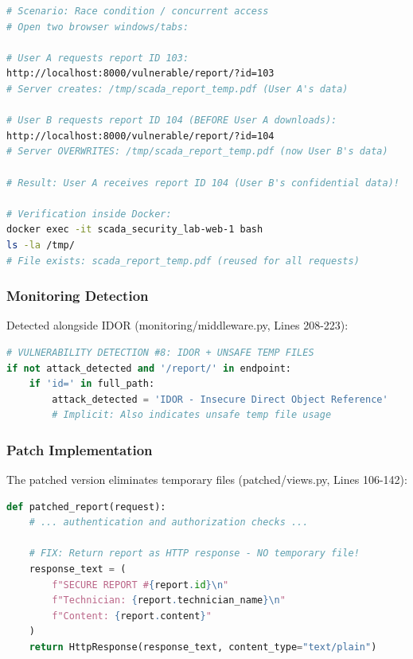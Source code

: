 \documentclass[12pt,a4paper]{article}
\begin{document}
\begin{lstlisting}[language=bash]
# Scenario: Race condition / concurrent access
# Open two browser windows/tabs:

# User A requests report ID 103:
http://localhost:8000/vulnerable/report/?id=103
# Server creates: /tmp/scada_report_temp.pdf (User A's data)

# User B requests report ID 104 (BEFORE User A downloads):
http://localhost:8000/vulnerable/report/?id=104
# Server OVERWRITES: /tmp/scada_report_temp.pdf (now User B's data)

# Result: User A receives report ID 104 (User B's confidential data)!

# Verification inside Docker:
docker exec -it scada_security_lab-web-1 bash
ls -la /tmp/
# File exists: scada_report_temp.pdf (reused for all requests)
\end{lstlisting}

\subsubsection{Monitoring Detection}

Detected alongside IDOR (monitoring/middleware.py, Lines 208-223):

\begin{lstlisting}[language=Python]
# VULNERABILITY DETECTION #8: IDOR + UNSAFE TEMP FILES
if not attack_detected and '/report/' in endpoint:
    if 'id=' in full_path:
        attack_detected = 'IDOR - Insecure Direct Object Reference'
        # Implicit: Also indicates unsafe temp file usage
\end{lstlisting}

\subsubsection{Patch Implementation}

The patched version eliminates temporary files (patched/views.py, Lines 106-142):

\begin{lstlisting}[language=Python]
def patched_report(request):
    # ... authentication and authorization checks ...
    
    # FIX: Return report as HTTP response - NO temporary file!
    response_text = (
        f"SECURE REPORT #{report.id}\n"
        f"Technician: {report.technician_name}\n"
        f"Content: {report.content}"
    )
    return HttpResponse(response_text, content_type="text/plain")
\end{lstlisting}
\end{document}

